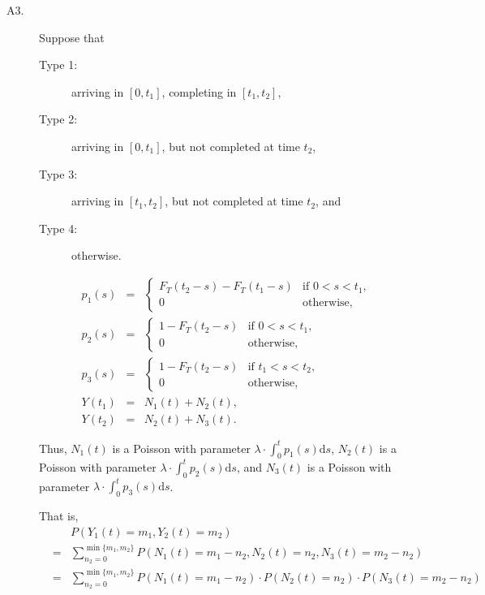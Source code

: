 \begin{example}
\begin{description}
\item[A3.] Suppose that
\begin{description}
  \item[Type 1:] arriving in $ [0, t_{1}] $, completing in $ [t_{1}, t_{2}] $,
  \item[Type 2:] arriving in $ [0, t_{1}] $, but not completed at time $ t_{2} $,
  \item[Type 3:] arriving in $ [t_{1}, t_{2}] $, but not completed at time $ t_{2} $, and
  \item[Type 4:] otherwise.
\end{description}
\begin{eqnarray*}
p_{1}(s) & = &
  \begin{cases}
    F_{T}(t_{2} - s) - F_{T}(t_{1} - s) & \text{if } 0 < s < t_{1}, \\
    0                                   & \text{otherwise},
  \end{cases} \\
p_{2}(s) & = &
  \begin{cases}
    1 - F_{T}(t_{2} - s)                & \text{if } 0 < s < t_{1}, \\
    0                                   & \text{otherwise},
  \end{cases} \\
p_{3}(s) & = &
  \begin{cases}
    1 - F_{T}(t_{2} - s)                & \text{if } t_{1} < s < t_{2}, \\
    0                                   & \text{otherwise},
  \end{cases} \\
Y(t_{1}) & = & N_{1}(t) + N_{2}(t), \\
Y(t_{2}) & = & N_{2}(t) + N_{3}(t).
\end{eqnarray*}

Thus, $ N_{1}(t) $ is a Poisson with parameter $ \lambda \cdot \int_{0}^{t} p_{1}(s) \mathrm{d}s $, $ N_{2}(t) $ is a Poisson with parameter $ \lambda \cdot \int_{0}^{t} p_{2}(s) \mathrm{d}s $, and $ N_{3}(t) $ is a Poisson with parameter $ \lambda \cdot \int_{0}^{t} p_{3}(s) \mathrm{d}s $.

That is,
\begin{eqnarray*}
  &   & P(Y_{1}(t) = m_{1}, Y_{2}(t) = m_{2}) \\
  & = & \sum_{n_{2} = 0}^{\min \{ m_{1}, m_{2} \}} P(N_{1}(t) = m_{1} - n_{2}, N_{2}(t) = n_{2}, N_{3}(t) = m_{2} - n_{2}) \\
  & = & \sum_{n_{2} = 0}^{\min \{ m_{1}, m_{2} \}} P(N_{1}(t) = m_{1} - n_{2}) \cdot P(N_{2}(t) = n_{2}) \cdot P(N_{3}(t) = m_{2} - n_{2}) \\
\end{eqnarray*}
\end{description}
\end{example}

